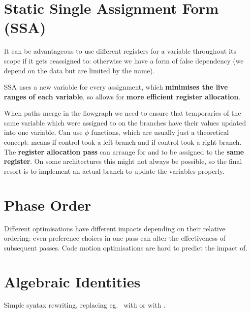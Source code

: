 \documentclass[a4paper, 11pt]{article}
\begin{document}
\section*{Static Single Assignment Form (SSA)}
{
    It can be advantageous to use different registers for a variable throughout its scope if it gets reassigned to: otherwise we have a form of false dependency (we depend on the data but are limited by the name).

    SSA uses a new variable for every assignment, which \textbf{minimises the live ranges of each variable}, so allows for \textbf{more efficient register allocation}.

    When paths merge in the flowgraph we need to ensure that temporaries of the same variable which were assigned to on the branches have their values updated into one variable. Can use \(\phi\) functions, which are usually just a theoretical concept:  means  if control took a left branch and  if control took a right branch. The \textbf{register allocation pass} can arrange for  and  to be assigned to the \textbf{same register}. On some architectures this might not always be possible, so the final resort is to implement an actual branch to update the variables properly.
}
\section*{Phase Order}
{
    Different optimisations have different impacts depending on their relative ordering: even preference choices in one pass can alter the effectiveness of subsequent passes. Code motion optimisations are hard to predict the impact of.
}
\section*{Algebraic Identities}
{
    Simple syntax rewriting, replacing eg.\  with  or \monospace{[1,2] ++ [3,4]} with \monospace{[1,2,3,4]}.
}
\end{document}
